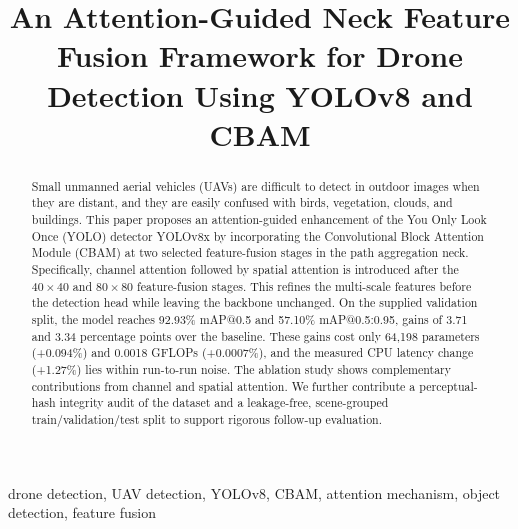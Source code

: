 \documentclass[conference]{IEEEtran}
\begin{document}
\title{An Attention-Guided Neck Feature Fusion Framework for Drone Detection Using YOLOv8 and CBAM}

\author{
}

\maketitle

\begin{abstract}
Small unmanned aerial vehicles (UAVs) are difficult to detect in outdoor images when they are distant, and they are easily confused with birds, vegetation, clouds, and buildings. This paper proposes an attention-guided enhancement of the You Only Look Once (YOLO) detector YOLOv8x by incorporating the Convolutional Block Attention Module (CBAM) at two selected feature-fusion stages in the path aggregation neck. Specifically, channel attention followed by spatial attention is introduced after the $40\times40$ and $80\times80$ feature-fusion stages. This refines the multi-scale features before the detection head while leaving the backbone unchanged. On the supplied validation split, the model reaches 92.93\% mAP@0.5 and 57.10\% mAP@0.5:0.95, gains of 3.71 and 3.34 percentage points over the baseline. These gains cost only 64,198 parameters (+0.094\%) and 0.0018 GFLOPs (+0.0007\%), and the measured CPU latency change (+1.27\%) lies within run-to-run noise. The ablation study shows complementary contributions from channel and spatial attention. We further contribute a perceptual-hash integrity audit of the dataset and a leakage-free, scene-grouped train/validation/test split to support rigorous follow-up evaluation.
\end{abstract}

\begin{IEEEkeywords}
drone detection, UAV detection, YOLOv8, CBAM, attention mechanism, object detection, feature fusion
\end{IEEEkeywords}
\end{document}
